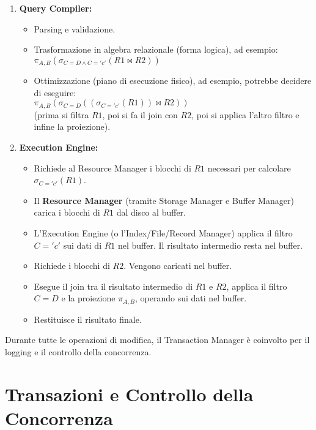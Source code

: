 \begin{enumerate}
    \item \textbf{Query Compiler:}
    \begin{itemize}
        \item Parsing e validazione.
        \item Trasformazione in algebra relazionale (forma logica), ad esempio:\\
        $\pi_{A,B} ( \sigma_{C=D \land C='c'} (R1 \bowtie R2) )$
        \item Ottimizzazione (piano di esecuzione fisico), ad esempio, potrebbe decidere di eseguire:\\
        $\pi_{A,B}(\sigma_{C=D}( (\sigma_{C='c'}(R1)) \bowtie R2 ))$\\
        (prima si filtra $R1$, poi si fa il join con $R2$, poi si applica l'altro filtro e infine la proiezione).
    \end{itemize}
    
    \item \textbf{Execution Engine:}
    \begin{itemize}
        \item Richiede al Resource Manager i blocchi di $R1$ necessari per calcolare $\sigma_{C='c'}(R1)$.
        \item Il \textbf{Resource Manager} (tramite Storage Manager e Buffer Manager) carica i blocchi di $R1$ dal disco al buffer.
        \item L'Execution Engine (o l'Index/File/Record Manager) applica il filtro $C='c'$ sui dati di $R1$ nel buffer. Il risultato intermedio resta nel buffer.
        \item Richiede i blocchi di $R2$. Vengono caricati nel buffer.
        \item Esegue il join tra il risultato intermedio di $R1$ e $R2$, applica il filtro $C=D$ e la proiezione $\pi_{A,B}$, operando sui dati nel buffer.
        \item Restituisce il risultato finale.
    \end{itemize}
\end{enumerate}
Durante tutte le operazioni di modifica, il Transaction Manager è coinvolto per il logging e il controllo della concorrenza.\section{Transazioni e Controllo della Concorrenza}

